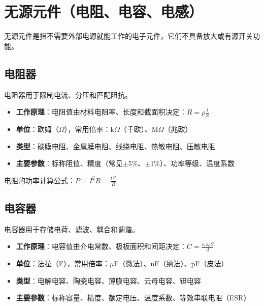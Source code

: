
\section{无源元件（电阻、电容、电感）}
\label{sec:passive_components}

无源元件是指不需要外部电源就能工作的电子元件，它们不具备放大或有源开关功能。

\subsection{电阻器}

电阻器用于限制电流、分压和匹配阻抗。

\begin{itemize}
    \item \textbf{工作原理}：电阻值由材料电阻率、长度和截面积决定：$R = \rho\frac{l}{S}$
    \item \textbf{单位}：欧姆（$\Omega$），常用倍率：k$\Omega$（千欧）、M$\Omega$（兆欧）
    \item \textbf{类型}：碳膜电阻、金属膜电阻、线绕电阻、热敏电阻、压敏电阻
    \item \textbf{主要参数}：标称阻值、精度（常见$\pm$5\%、$\pm$1\%）、功率等级、温度系数
\end{itemize}

电阻的功率计算公式：$P = I^2R = \frac{U^2}{R}$

\subsection{电容器}

电容器用于存储电荷、滤波、耦合和调谐。

\begin{itemize}
    \item \textbf{工作原理}：电容值由介电常数、极板面积和间距决定：$C = \frac{\varepsilon_r\varepsilon_0 S}{d}$
    \item \textbf{单位}：法拉（F），常用倍率：$\mu$F（微法）、nF（纳法）、pF（皮法）
    \item \textbf{类型}：电解电容、陶瓷电容、薄膜电容、云母电容、钽电容
    \item \textbf{主要参数}：标称容量、精度、额定电压、温度系数、等效串联电阻（ESR）
\end{itemize}

